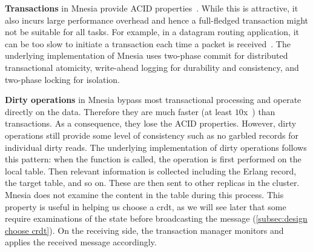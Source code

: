 \textbf{Transactions} in Mnesia provide ACID properties~\cite{ericssonab2023mnesiaguide}.
While this is attractive, it also incurs large performance overhead 
and hence a full-fledged transaction might not be suitable for all tasks.
For example, in a datagram routing application, it can be too slow to initiate
a transaction each time a packet is received~\cite{ericssonab2023mnesiaguide}.
The underlying implementation of Mnesia uses two-phase commit
for distributed transactional atomicity, write-ahead logging for durability and consistency, 
and two-phase locking for isolation.

\textbf{Dirty operations} in Mnesia bypass most transactional processing
and operate directly on the data. Therefore they are much faster 
(at least \(10\)x~\cite{ericssonab2023mnesiaref}) than transactions. As a consequence,
they lose the ACID properties. However, dirty operations still provide 
some level of consistency such as no garbled records for individual dirty reads.
The underlying implementation of dirty operations follows this pattern:
when the function is called, the operation is first performed
on the local table. Then relevant information is collected including
the Erlang record, the target table, and so on. These are then sent 
to other replicas in the cluster.
Mnesia does not examine the content in the table during this process. This 
property is useful in helping us choose a \acrshort{crdt},
as we will see later that some  require examinations of the state
before broadcasting the message (\cref{subsec:design choose crdt}).
On the receiving side, the transaction manager monitors and
applies the received message accordingly.







